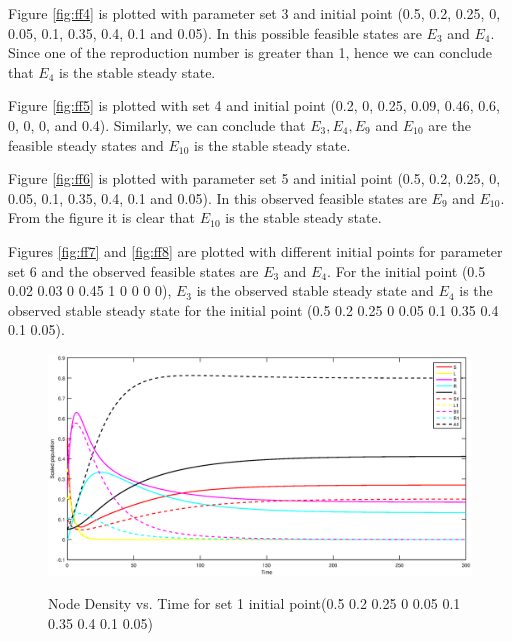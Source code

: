 \noindent Figure \ref{fig:ff4} is plotted with parameter set 3 and initial point (0.5, 0.2, 0.25, 0, 0.05, 0.1, 0.35, 0.4, 0.1 and 0.05). In this possible feasible states are $E_{3}$ and $ E_{4}$. Since one of the reproduction number is greater than 1, hence we can conclude that $E_{4}$ is the stable steady state.

\noindent Figure \ref{fig:ff5} is plotted with set 4 and initial point (0.2, 0, 0.25, 0.09, 0.46, 0.6, 0, 0, 0, and 0.4).
Similarly, we can conclude that $E_{3}, E_{4}, E_{9}$  and $E_{10}$ are the feasible steady states and $E_{10}$ is the stable steady state.
%
%

\noindent Figure \ref{fig:ff6} is plotted with parameter set 5 and initial point (0.5, 0.2, 0.25, 0, 0.05, 0.1, 0.35, 0.4, 0.1 and 0.05). In this observed feasible states are $ E_{9}$ and  $E_{10}$. From the figure it is clear that $E_{10}$ is the stable steady state.

\noindent Figures \ref{fig:ff7} and \ref{fig:ff8} are plotted with different initial points for parameter set 6 and the observed feasible states are $ E_{3}$ and  $E_{4}$. For the initial point (0.5 0.02 0.03 0 0.45 1 0 0 0 0), $E_{3}$ is the observed stable steady state and $E_{4}$ is the observed stable steady state for the initial point (0.5 0.2 0.25 0 0.05 0.1 0.35 0.4 0.1 0.05).

\newpage
\begin{figure}[h!]
\centering
  \includegraphics[width=7.0in]{1.eps}\\
  \caption{Node Density vs. Time for set 1 initial point(0.5 0.2 0.25 0 0.05 0.1 0.35 0.4 0.1 0.05)}\label{fig:ff0}
\end{figure}


